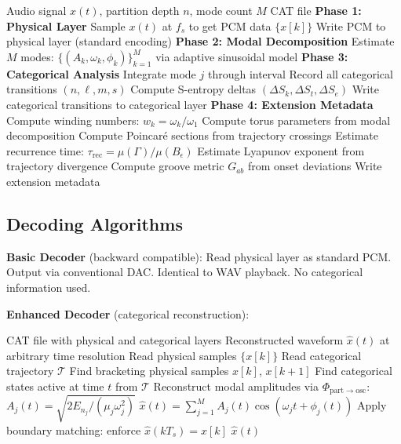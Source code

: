 \documentclass[twocolumn,10pt]{article}
\theoremstyle{remark}
\newcommand{\Sk}{S_k}
\newcommand{\St}{S_t}
\newcommand{\Se}{S_e}
\newcommand{\calT}{\mathcal{T}}
\begin{document}
\begin{algorithm}
\caption{CAT Encoder}
\label{alg:encoder}
\begin{algorithmic}[1]
\Require Audio signal $x(t)$, partition depth $n$, mode count $M$
\Ensure CAT file
\State \textbf{Phase 1: Physical Layer}
\State Sample $x(t)$ at $f_s$ to get PCM data $\{x[k]\}$
\State Write PCM to physical layer (standard encoding)
\State
\State \textbf{Phase 2: Modal Decomposition}
\State Estimate $M$ modes: $\{(A_k, \omega_k, \phi_k)\}_{k=1}^M$ via adaptive sinusoidal model
\State
\State \textbf{Phase 3: Categorical Analysis}
        \State Integrate mode $j$ through interval
        \State Record all categorical transitions $(n, \ell, m, s)$
        \State Compute S-entropy deltas $(\Delta\Sk, \Delta\St, \Delta\Se)$
    \EndFor
\EndFor
\State Write categorical transitions to categorical layer
\State
\State \textbf{Phase 4: Extension Metadata}
\State Compute winding numbers: $w_k = \omega_k/\omega_1$
\State Compute torus parameters from modal decomposition
\State Compute Poincar\'{e} sections from trajectory crossings
\State Estimate recurrence time: $\tau_{\mathrm{rec}} = \mu(\Gamma)/\mu(B_\epsilon)$
\State Estimate Lyapunov exponent from trajectory divergence
\State Compute groove metric $G_{ab}$ from onset deviations
\State Write extension metadata
\end{algorithmic}
\end{algorithm}

\subsection{Decoding Algorithms}

\textbf{Basic Decoder} (backward compatible):
Read physical layer as standard PCM. Output via conventional DAC. Identical to WAV playback. No categorical information used.

\textbf{Enhanced Decoder} (categorical reconstruction):
\begin{algorithm}
\caption{CAT Enhanced Decoder}
\label{alg:decoder}
\begin{algorithmic}[1]
\Require CAT file with physical and categorical layers
\Ensure Reconstructed waveform $\hat{x}(t)$ at arbitrary time resolution
\State Read physical samples $\{x[k]\}$
\State Read categorical trajectory $\calT$
    \State Find bracketing physical samples $x[k]$, $x[k+1]$
    \State Find categorical states active at time $t$ from $\calT$
    \State Reconstruct modal amplitudes via $\Phi_{\mathrm{part} \to \mathrm{osc}}$:
    \State \quad $A_j(t) = \sqrt{2E_{n_j}/(\mu_j \omega_j^2)}$
    \State \quad $\hat{x}(t) = \sum_{j=1}^{M} A_j(t) \cos(\omega_j t + \phi_j(t))$
    \State Apply boundary matching: enforce $\hat{x}(kT_s) = x[k]$
\EndFor
\State \Return $\hat{x}(t)$
\end{algorithmic}
\end{algorithm}
\end{document}
